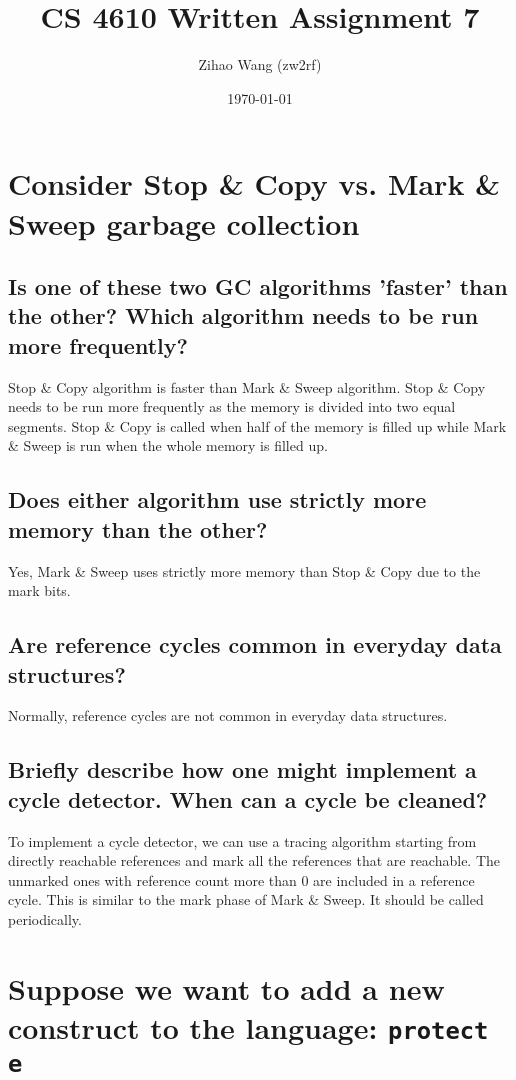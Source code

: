 \documentclass[11pt]{article}
\begin{document}
\thispagestyle{empty}
\title{CS 4610 Written Assignment 7}
\author{Zihao Wang (zw2rf)}
\date{\today}
\maketitle
\doublespacing

\section{Consider Stop \& Copy vs. Mark \& Sweep garbage collection}

\subsection{Is one of these two GC algorithms 'faster' than the other? Which algorithm needs to be run more frequently?}
Stop \& Copy algorithm is faster than Mark \& Sweep algorithm. Stop \& Copy needs to be run more frequently as the memory is divided into two equal segments. Stop \& Copy is called when half of the memory is filled up while Mark \& Sweep is run when the whole memory is filled up.

\subsection{Does either algorithm use strictly more memory than the other?}
Yes, Mark \& Sweep uses strictly more memory than Stop \& Copy due to the mark bits.

\subsection{Are reference cycles common in everyday data structures?}
Normally, reference cycles are not common in everyday data structures.

\subsection{Briefly describe how one might implement a cycle detector. When can a cycle be cleaned?}
To implement a cycle detector, we can use a tracing algorithm starting from directly reachable references and mark all the references that are reachable. The unmarked ones with reference count more than 0 are included in a reference cycle. This is similar to the mark phase of Mark \& Sweep. It should be called periodically. 

\section{Suppose we want to add a new construct to the language: \lstinline|protect e|}
\end{document}
